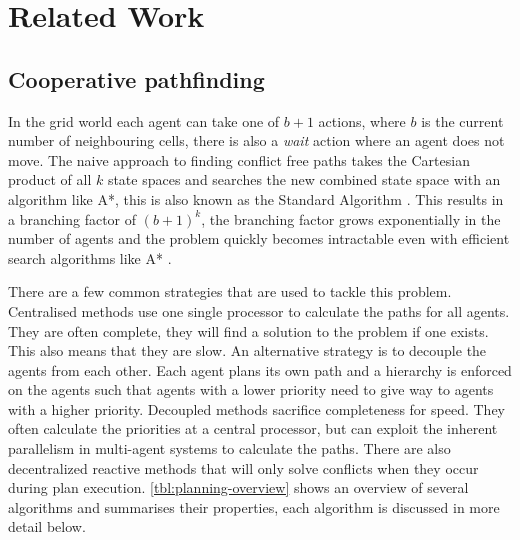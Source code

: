 \section{Related Work}\label{sec:related}

\subsection{Cooperative pathfinding}
In the grid world each agent can take one of $b+1$ actions, where $b$ is the
current number of neighbouring cells, there is also a \textit{wait} action
where an agent does not move. The naive approach to finding conflict free paths
takes the Cartesian product of all $k$ state spaces and searches the new
combined state space with an algorithm like A*, this is also known as the
Standard Algorithm \cite{standley2010}. This results in a branching factor of
$(b+1)^k$, the branching factor grows exponentially in the number of agents and
the problem quickly becomes intractable even with efficient search algorithms
like A* \cite{sharon2013}.

There are a few common strategies that are used to tackle this problem.
Centralised methods use one single processor to calculate the paths for all
agents. They are often complete, they will find a solution to the problem if
one exists. This also means that they are slow. An alternative strategy is to
decouple the agents from each other. Each agent plans its own path and a
hierarchy is enforced on the agents such that agents with a lower priority need
to give way to agents with a higher priority. Decoupled methods sacrifice
completeness for speed. They often calculate the priorities at a central
processor, but can exploit the inherent parallelism in multi-agent systems to
calculate the paths. There are also decentralized reactive methods that will
only solve conflicts when they occur during plan execution.
\autoref{tbl:planning-overview} shows an overview of several algorithms and
summarises their properties, each algorithm is discussed in more detail below.

